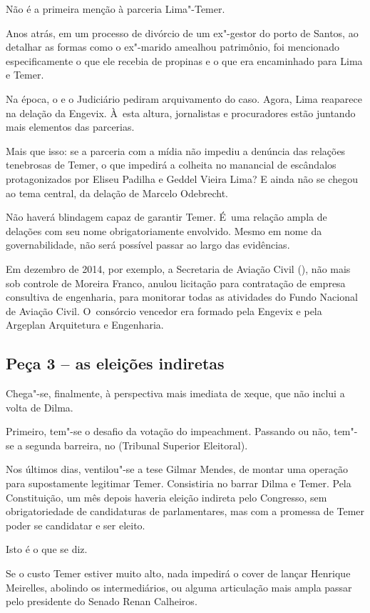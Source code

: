Não é a primeira menção à parceria Lima"-Temer.

Anos atrás, em um processo de divórcio de um ex"-gestor do porto de
Santos, ao detalhar as formas como o ex"-marido amealhou patrimônio, foi
mencionado especificamente o que ele recebia de propinas e o que era
encaminhado para Lima e Temer.

Na época, o  e o Judiciário pediram arquivamento do caso. Agora, Lima
reaparece na delação da Engevix. À~esta altura, jornalistas e
procuradores estão juntando mais elementos das parcerias.

Mais que isso: se a parceria com a mídia não impediu a denúncia das
relações tenebrosas de Temer, o que impedirá a colheita no manancial de
escândalos protagonizados por Eliseu Padilha e Geddel Vieira Lima? E
ainda não se chegou ao tema central, da delação de Marcelo Odebrecht.

Não haverá blindagem capaz de garantir Temer. É~uma relação ampla de
delações com seu nome obrigatoriamente envolvido. Mesmo em nome da
governabilidade, não será possível passar ao largo das evidências.

Em dezembro de 2014, por exemplo, a Secretaria de Aviação Civil (),
não mais sob controle de Moreira Franco, anulou licitação para
contratação de empresa consultiva de engenharia, para monitorar todas as
atividades do Fundo Nacional de Aviação Civil. O~consórcio vencedor era
formado pela Engevix e pela Argeplan Arquitetura e Engenharia.

\subsection{Peça 3 -- as eleições indiretas}

Chega"-se, finalmente, à perspectiva mais imediata de xeque, que não
inclui a volta de Dilma.

Primeiro, tem"-se o desafio da votação do impeachment. Passando ou não,
tem"-se a segunda barreira, no  (Tribunal Superior Eleitoral).

Nos últimos dias, ventilou"-se a tese Gilmar Mendes, de montar uma
operação para supostamente legitimar Temer. Consistiria no  barrar
Dilma e Temer. Pela Constituição, um mês depois haveria eleição indireta
pelo Congresso, sem obrigatoriedade de candidaturas de parlamentares,
mas com a promessa de Temer poder se candidatar e ser eleito.

Isto é o que se diz.

Se o custo Temer estiver muito alto, nada impedirá o  cover de
lançar Henrique Meirelles, abolindo os intermediários, ou alguma
articulação mais ampla passar pelo presidente do Senado Renan Calheiros.
